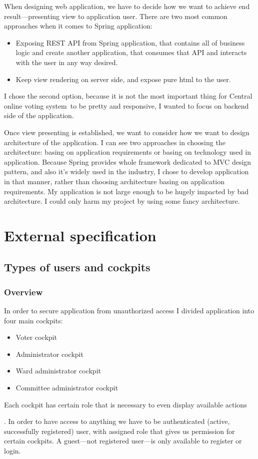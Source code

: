 \documentclass[a4paper,twoside,12pt]{book}
\newcommand{\ksremark}[1]{%
{%
{\color{brickred}{[\foreignlanguage{polish}{#1}]}}}%
\addcontentsline{rks}{uwagas}{\protect{\foreignlanguage{polish}{#1}}}%
}
\newcommand{\Title}{Central online voting system}
\begin{document}
    When designing web application, we have to decide how we want to achieve end result---presenting view to application user.
    There are two most common approaches when it comes to Spring application:
    \begin{itemize}
      \item Exposing REST API from Spring application, that contains all of business logic and create another application, that consumes that API and interacts with the user in any way desired.
      \item Keep view rendering on server side, and expose pure html to the user.
    \end{itemize}
    I chose the second option, because it is not the most important thing for \Title\ to be pretty and responsive, I wanted to focus on backend side of the application.

    Once view presenting is established, we want to consider how we want to design architecture of the application.
    I can see two approaches in choosing the architecture: basing on application requirements or basing on technology used in application.
    Because Spring provides whole framework dedicated to MVC design pattern, and also it's widely used in the industry, I chose to develop application in that manner,
    rather than choosing architecture basing on application requirements. 
    My application is not large enough to be hugely impacted by bad architecture. I could only harm my project by using some fancy architecture.

\chapter{External specification}
  \section{Types of users and cockpits}
    \subsection{Overview}
    In order to secure application from unauthorized access  I divided application into four main cockpits:
    \begin{itemize}
      \item Voter cockpit
      \item Administrator cockpit
      \item Ward administrator cockpit
      \item Committee administrator cockpit
    \end{itemize}
    Each cockpit has certain role that is necessary to even display available actions \ksremark{?}. 
    In order to have access to anything we have to be authenticated (active, successfully registered) user, with assigned role that gives us permission for certain cockpits.
    A guest---not registered user---is only available to register or login.
\end{document}

